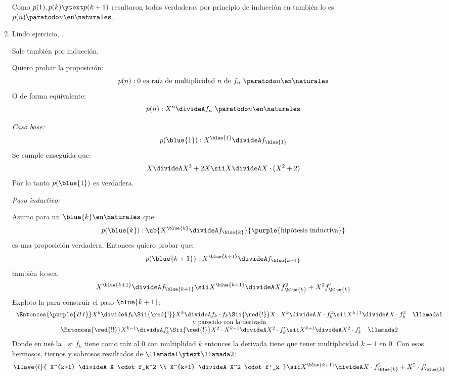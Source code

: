 \begin{enumerate}[label=\roman*)]
        \medskip

        Como $p(1), p(k) \ytext p(k+1)$ resultaron todas verdaderas por principio de inducción en también lo es $p(n) \paratodo n \en \naturales$.

  \item Lindo ejercicio, .

        Sale también por inducción.

        Quiero probar la proposición:
        $$
          p(n) : \text{0 es raíz de multiplicidad $n$ de $f_n \ \paratodo n \en \naturales$}
        $$
        O de forma equivalente:
        $$
          p(n) :  X^n \divideA f_n \ \paratodo n \en \naturales
        $$

        \textit{Caso base:}
        $$
          p(\blue{1}) : X^{\blue{1}} \divideA f_{\blue{1}}
        $$
        Se cumple enseguida que:
        $$
          X \divideA X^3 + 2X
          \sii
          X \divideA X \cdot (X^2 + 2)
        $$
        Por lo tanto $p(\blue{1})$ es verdadera.

        \textit{Paso inductivo:}

        Asumo para un $\blue{k} \en \naturales$ que:
        $$
          p(\blue{k}) : \ub{
            X^{\blue{k}} \divideA f_{\blue{k}}
          }{
            \text{\purple{hipótesis inductiva}}
          }
        $$
        es una proposición verdadera. Entonces quiero probar que:
        $$
          p(\blue{k + 1}) : X^{\blue{k+1}} \divideA f_{\blue{k+1}}
        $$
        también lo sea.
        $$
          X^{\blue{k+1}} \divideA f_{\blue{k+1}}
          \sii
          X^{\blue{k+1}} \divideA Xf_{\blue{k}}^2 + X^2f'_{\blue{k}}
        $$
        Exploto la  para construir el paso $\blue{k+1}$:
        $$
          \begin{array}{c}
            \Entonces{\purple{HI}}
            X^k \divideA f_k
            \Sii{\red{!}}
            X^k \divideA f_k \cdot f_k
            \Sii{\red{!}}
            X \cdot X^k \divideA X\cdot f_k^2
            \sii
            X^{k+1} \divideA X \cdot f_k^2  \quad \llamada1 \\
            \text{y parecido con la derivada}               \\
            \Entonces{\red{!!}}	      X^{k-1} \divideA f'_k
            \Sii{\red{!}}
            X^2 \cdot X^{k-1} \divideA X^2 \cdot f'_k
            \sii
            X^{k+1} \divideA X^2 \cdot f'_k \quad \llamada2
          \end{array}
        $$
        Donde en \red{!!} usé la , si $f_k$ tiene como raíz al 0 con multiplidad $k$ entonces la derivada tiene que
        tener multiplicidad $k-1$ en 0.
        Con esos hermosos, tiernos y sabrosos resultados de $\llamada1 \ytext \llamada2$:
        $$
          \llave{l}{
            X^{k+1} \divideA X \cdot f_k^2  \\
            X^{k+1} \divideA X^2 \cdot f'_k
          }
          \sii
          X^{\blue{k+1}} \divideA X \cdot f_{\blue{k}}^2 +  X^2 \cdot f'_{\blue{k}} \\
        $$


\end{enumerate}
